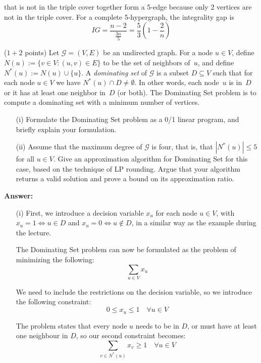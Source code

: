 \documentclass{article}
\newcommand{\G}{\ensuremath{\mathcal{G}}}
\newcommand{\graph}{\G}
\newcommand{\domset}{{\sc Dominating Set}\xspace}
\renewcommand{\leq}{\leqslant}
\renewcommand{\geq}{\geqslant}
\newcounter{rcounter}
\newenvironment{rlist}%
{\begin{list}{\setnr-\arabic{rcounter}}{\usecounter{rcounter}}}{\end{list}}
\begin{document}
\begin{rlist}
\begin{enumerate}
            that is not in the triple cover together form a 5-edge because only 2 vertices are not in the triple cover. For a complete 5-hypergraph,
            the integrality gap is
            $$IG=\frac{n-2}{\frac{3n}{5}} = \frac{5}{3} (1-\frac{2}{n})$$
        \end{enumerate}
        \item ($1+2$ points)
        Let $\graph=(V,E)$ be an undirected graph. For a node $u\in V$, define $N(u) := \{ v \in V: (u,v) \in E\}$ to be the set of neighbors of~$u$, and define $N^*(u) := N(u) \cup \{ u\}$. A \emph{dominating set} of $\graph$ is a subset $D\subseteq V$ such that for each node $u\in V$ we have $N^*(u) \cap D \neq \emptyset$. In other words, each node~$u$ is in~$D$ or it has at least one neighbor in~$D$ (or both). The \domset problem is to compute a dominating set with a minimum number of vertices.
        \begin{enumerate}
            \item[(i)]
            Formulate the \domset problem as a 0/1 linear program, and briefly explain your formulation.
            \item[(ii)]
            Assume that the maximum degree of $\graph$ is four, that is, that      $|N^*(u)|\leq 5$ for all $u\in V$. Give an approximation algorithm for \domset for this case, based on the technique of LP rounding. Argue that your algorithm returns a valid solution and prove a bound on its approximation ratio.
        \end{enumerate}
        
        \textbf{Answer:}
        \begin{enumerate}
            \item[(i)]
            First, we introduce a decision variable $x_u$ for each node $u \in V$, with $x_u = 1 \iff u \in D$ and $x_u = 0 \iff u \not\in D$, in a similar way as the example during the lecture.
            
            The \domset problem can now be formulated as the problem of minimizing the following:
            $$\sum_{u \in V} x_u$$
            
            We need to include the restrictions on the decision variable, so we introduce the following constraint:
            $$0 \leq x_u \leq 1 \quad \forall u \in V$$
            
            The problem states that every node $u$ needs to be in $D$, or must have at least one neighbour in $D$, so our second constraint becomes:
            $$\sum_{v \in N^*(u)}x_v \geq 1 \quad \forall u \in V$$
            

\end{enumerate}
\end{rlist}
\end{document}
